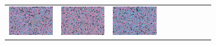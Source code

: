 \documentclass{ipol}
\begin{document}
\begin{figure}[ht]
\begin{subfigure}[t]{\linewidth}
\begin{tabular}{ccccccccc}
                \includegraphics[width=\s]{images/carnival/AHD/iso_j95_64_grids.png}&
                \includegraphics[width=\s]{images/carnival/DCB/iso_j95_64_grids.png}&
                \includegraphics[width=\s]{images/carnival/DHT/iso_j95_64_grids.png}&

\end{tabular}
\end{subfigure}
\end{figure}
\end{document}
